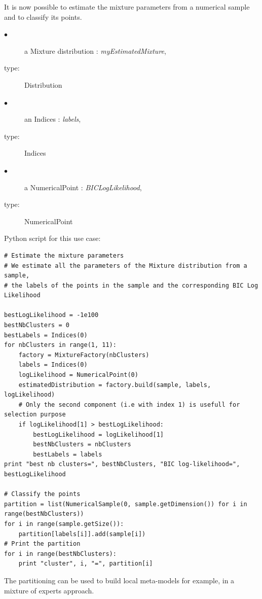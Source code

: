It is now possible to estimate the mixture parameters from a numerical sample and to classify its points.

{
  \begin{description}
  \item[$\bullet$] a Mixture distribution : {\itshape myEstimatedMixture},
  \item[type:] Distribution
  \item[$\bullet$] an Indices : {\itshape labels},
  \item[type:] Indices
  \item[$\bullet$] a NumericalPoint : {\itshape BICLogLikelihood},
  \item[type:] NumericalPoint
  \end{description}
}
\espace

\espace
Python script for this use case:

\begin{lstlisting}
# Estimate the mixture parameters
# We estimate all the parameters of the Mixture distribution from a sample,
# the labels of the points in the sample and the corresponding BIC Log Likelihood

bestLogLikelihood = -1e100
bestNbClusters = 0
bestLabels = Indices(0)
for nbClusters in range(1, 11):
    factory = MixtureFactory(nbClusters)
    labels = Indices(0)
    logLikelihood = NumericalPoint(0)
    estimatedDistribution = factory.build(sample, labels, logLikelihood)
    # Only the second component (i.e with index 1) is usefull for selection purpose
    if logLikelihood[1] > bestLogLikelihood:
        bestLogLikelihood = logLikelihood[1]
        bestNbClusters = nbClusters
        bestLabels = labels
print "best nb clusters=", bestNbClusters, "BIC log-likelihood=", bestLogLikelihood

# Classify the points
partition = list(NumericalSample(0, sample.getDimension()) for i in range(bestNbClusters))
for i in range(sample.getSize()):
    partition[labels[i]].add(sample[i])
# Print the partition
for i in range(bestNbClusters):
    print "cluster", i, "=", partition[i]
\end{lstlisting}
The partitioning can be used to build local meta-models for example, in a mixture of experts approach.